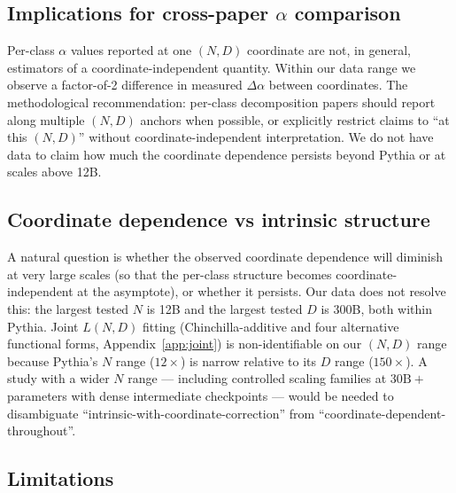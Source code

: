 \documentclass[10pt]{article}
\newcommand{\dalpha}{\Delta\alpha}
\begin{document}
\subsection{Implications for cross-paper $\alpha$ comparison}

Per-class $\alpha$ values reported at one $(N, D)$ coordinate are
not, in general, estimators of a coordinate-independent quantity.
Within our data range we observe a factor-of-2 difference in measured
$\dalpha$ between coordinates. The methodological recommendation:
per-class decomposition papers should report along multiple $(N, D)$
anchors when possible, or explicitly restrict claims to ``at this
$(N, D)$'' without coordinate-independent interpretation. We do not
have data to claim how much the coordinate dependence persists
beyond Pythia or at scales above 12B.

\subsection{Coordinate dependence vs intrinsic structure}

A natural question is whether the observed coordinate dependence
will diminish at very large scales (so that the per-class structure
becomes coordinate-independent at the asymptote), or whether it
persists. Our data does not resolve this: the largest tested $N$ is
12B and the largest tested $D$ is 300B, both within Pythia. Joint
$L(N, D)$ fitting (Chinchilla-additive and four alternative
functional forms, Appendix~\ref{app:joint}) is non-identifiable on
our $(N, D)$ range because Pythia's $N$ range ($12\times$) is narrow
relative to its $D$ range ($150\times$). A study with a wider $N$
range --- including controlled scaling families at $30\text{B}+$
parameters with dense intermediate checkpoints --- would be needed
to disambiguate ``intrinsic-with-coordinate-correction'' from
``coordinate-dependent-throughout''.

\subsection{Limitations}
\label{sec:limits}
\end{document}
